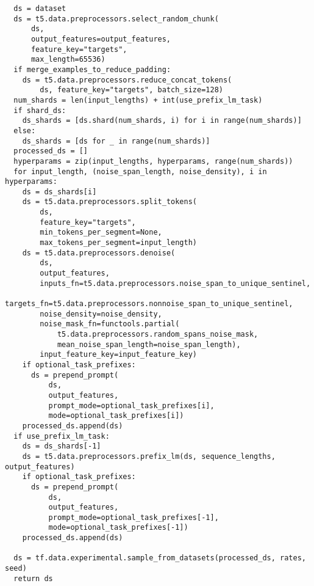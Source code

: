 \documentclass[10pt]{article}
\begin{document}
\begin{lstlisting}
  ds = dataset
  ds = t5.data.preprocessors.select_random_chunk(
      ds,
      output_features=output_features,
      feature_key="targets",
      max_length=65536)
  if merge_examples_to_reduce_padding:
    ds = t5.data.preprocessors.reduce_concat_tokens(
        ds, feature_key="targets", batch_size=128)
  num_shards = len(input_lengths) + int(use_prefix_lm_task)
  if shard_ds:
    ds_shards = [ds.shard(num_shards, i) for i in range(num_shards)]
  else:
    ds_shards = [ds for _ in range(num_shards)]
  processed_ds = []
  hyperparams = zip(input_lengths, hyperparams, range(num_shards))
  for input_length, (noise_span_length, noise_density), i in hyperparams:
    ds = ds_shards[i]
    ds = t5.data.preprocessors.split_tokens(
        ds,
        feature_key="targets",
        min_tokens_per_segment=None,
        max_tokens_per_segment=input_length)
    ds = t5.data.preprocessors.denoise(
        ds,
        output_features,
        inputs_fn=t5.data.preprocessors.noise_span_to_unique_sentinel,
        targets_fn=t5.data.preprocessors.nonnoise_span_to_unique_sentinel,
        noise_density=noise_density,
        noise_mask_fn=functools.partial(
            t5.data.preprocessors.random_spans_noise_mask,
            mean_noise_span_length=noise_span_length),
        input_feature_key=input_feature_key)
    if optional_task_prefixes:
      ds = prepend_prompt(
          ds,
          output_features,
          prompt_mode=optional_task_prefixes[i],
          mode=optional_task_prefixes[i])
    processed_ds.append(ds)
  if use_prefix_lm_task:
    ds = ds_shards[-1]
    ds = t5.data.preprocessors.prefix_lm(ds, sequence_lengths, output_features)
    if optional_task_prefixes:
      ds = prepend_prompt(
          ds,
          output_features,
          prompt_mode=optional_task_prefixes[-1],
          mode=optional_task_prefixes[-1])
    processed_ds.append(ds)

  ds = tf.data.experimental.sample_from_datasets(processed_ds, rates, seed)
  return ds
\end{lstlisting}
\end{document}
